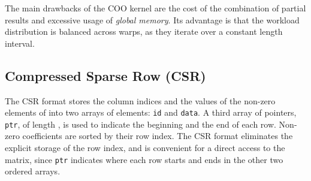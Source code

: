 \documentclass[runningheads,orivec]{llncs}
\begin{document}
The main drawbacks of the COO kernel are the cost of the combination of partial results and excessive usage of \textit{global memory}. Its advantage is that the workload distribution is balanced across warps, as they iterate over a constant length interval.   

\vspace*{-0.25cm}

\subsection*{Compressed Sparse Row (CSR)} 
\vspace*{-0.25cm}

The CSR format stores the column indices and the values of the non-zero elements of  into two arrays of  elements: \texttt{id} and \texttt{data}. A third array of pointers, \texttt{ptr}, of length , is used to indicate the beginning and the end of each row. Non-zero coefficients are sorted by their row index. The CSR format eliminates the explicit storage of the row index, and is convenient for a direct access to the matrix, since \texttt{ptr} indicates where each row starts and ends in the other two ordered arrays.
\end{document}
